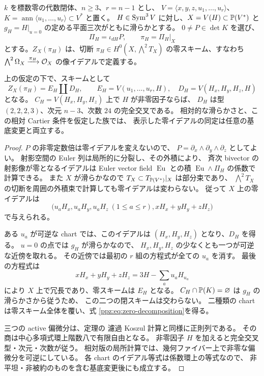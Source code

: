 $k$ を標数零の代数閉体、$n\geq3$、$r=n-1$ とし、
$V=\langle x,y,z,u_1,\ldots,u_r\rangle$、
$K=\operatorname{ann}\langle u_1,\ldots,u_r\rangle\subset V^*$ と置く。
$H\in\operatorname{Sym}^3V$ に対し、$X=V(H)\subset\mathbb P(V^*)$ と
$g_H=H|_{u=0}$ の定める平面三次がともに滑らかとする。
$0\ne P\in\det K$ を選び、
\[
 \Pi_H=\iota_{dH}P,\qquad \pi_H=\Pi_H|_X
\]
とする。$Z_X(\pi_H)$ は、切断 $\pi_H\in H^0(X,\bigwedge^2T_X)$
の零スキーム、すなわち
$\bigwedge^2\Omega_X\xrightarrow{\pi_H}\mathcal O_X$ の像イデアルで定義する。

\begin{proposition}
\label{ppz:prop:zero-scheme}
上の仮定の下で、スキームとして
\begin{equation}\label{ppz:eq:zero-decomposition}
 Z_X(\pi_H)=E_H\amalg D_H,\qquad
 E_H=V(u_1,\ldots,u_r,H),\quad
 D_H=V(H_x,H_y,H_z,H)
\end{equation}
となる。
$C_H=V(H_x,H_y,H_z)$ 上で $H$ が非零因子ならば、
$D_H$ は型 $(2,2,2,3)$、次元 $n-3$、次数 $24$ の完全交叉である。
相対的な滑らかさと、この相対 Cartier 条件を仮定した族では、
表示した零イデアルの同定は任意の基底変更と両立する。
\end{proposition}

\begin{proof}
$P$ の非零定数倍は零イデアルを変えないので、
$P=\partial_x\wedge\partial_y\wedge\partial_z$ としてよい。
射影空間の Euler 列は局所的に分裂し、その外積により、
斉次 bivector の射影像が零となるイデアルは
Euler vector field $\operatorname{Eu}$ との積
$\operatorname{Eu}\wedge\Pi_H$ の係数で計算できる。
また $X$ が滑らかなので $T_X\subset T_{\mathbb P(V^*)}|_X$ は部分束であり、
$\bigwedge^2T_X$ の切断を周囲の外積束で計算しても零イデアルは変わらない。
従って $X$ 上の零イデアルは
\begin{equation}\label{ppz:eq:zero-ideal}
 \bigl(u_aH_x,u_aH_y,u_aH_z\ (1\leq a\leq r),
       xH_x+yH_y+zH_z\bigr)
\end{equation}
で与えられる。

ある $u_a$ が可逆な chart では、このイデアルは
$(H_x,H_y,H_z)$ となり、$D_H$ を得る。
$u=0$ の点では $g_H$ が滑らかなので、
$H_x,H_y,H_z$ の少なくとも一つが可逆な近傍を取れる。
その近傍では最初の $r$ 組の方程式が全ての $u_a$ を消す。
最後の方程式は
\[
 xH_x+yH_y+zH_z=3H-\sum_a u_aH_{u_a}
\]
により $X$ 上で冗長であり、零スキームは $E_H$ となる。
$C_H\cap\mathbb P(K)=\varnothing$ は $g_H$ の滑らかさから従うため、
この二つの閉スキームは交わらない。
二種類の chart は零スキーム全体を覆い、式
\eqref{ppz:eq:zero-decomposition}を得る。

三つの active 偏微分は、定理の
濾過 Koszul 計算と同様に正則列である。
その商は中心多項式環上階数八で有限自由となる。
非零因子 $H$ を加えると完全交叉型・次元・次数が従う。
相対版の局所計算では、幾何ファイバー上で非零な偏微分を可逆にしている。
各 chart のイデアル等式は係数環上の等式なので、
非平坦・非被約のものを含む基底変更後にも成立する。
\end{proof}

